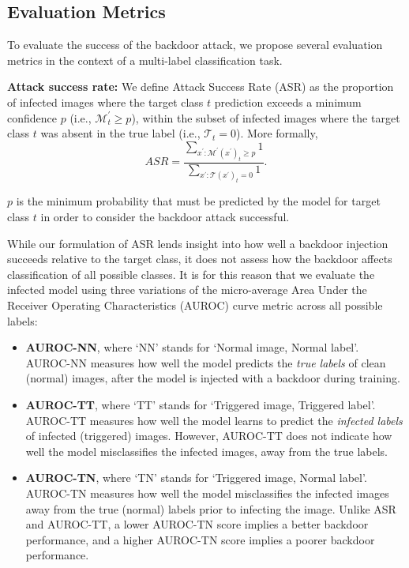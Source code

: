\documentclass[letterpaper]{article} %
\begin{document}
\subsection{Evaluation Metrics}
To evaluate the success of the backdoor attack, we propose several evaluation metrics in the context of a multi-label classification task.
 
\textbf{Attack success rate:} We define Attack Success Rate (ASR) as the proportion of infected images where the target class $t$ prediction exceeds a minimum confidence $p$ (i.e., $\mathcal{M}^\prime_t\geq p$), within the subset of infected images where the target class $t$ was absent in the true label (i.e., $\mathcal{T}_t=0$). More formally,
$$ ASR = \frac{\sum_{x^\prime : \mathcal{M}^\prime(x^\prime)_{t} \geq p } 1 }{ \sum_{x^\prime:\mathcal{T}(x^\prime)_t = 0} 1 }. $$ 

$p$ is the minimum probability that must be predicted by the model for target class $t$ in order to consider the backdoor attack successful. 

While our formulation of ASR lends insight into how well a backdoor injection succeeds relative to the target class, it does not assess how the backdoor affects classification of all possible classes. It is for this reason that we evaluate the infected model using three variations of the micro-average Area Under the Receiver Operating Characteristics (AUROC) curve metric across all possible labels:

\begin{itemize}
  \item \textbf{AUROC-NN}, where `NN' stands for `Normal image, Normal label'. AUROC-NN measures how well the model predicts the \textit{true labels} of clean (normal) images, after the model is injected with a backdoor during training.  
  
  \item \textbf{AUROC-TT}, where `TT' stands for `Triggered image, Triggered label'. AUROC-TT measures how well the model learns to predict the \textit{infected labels} of infected (triggered) images. However, AUROC-TT does not indicate how well the model misclassifies the infected images, away from the true labels.  %
  
  \item \textbf{AUROC-TN}, where `TN' stands for `Triggered image, Normal label'. AUROC-TN measures how well the model misclassifies the infected images away from the true (normal) labels prior to infecting the image. Unlike ASR and AUROC-TT, a lower AUROC-TN score implies a better backdoor performance, and a higher AUROC-TN score implies a poorer backdoor performance. 
 
\end{itemize}
 
\end{document}
